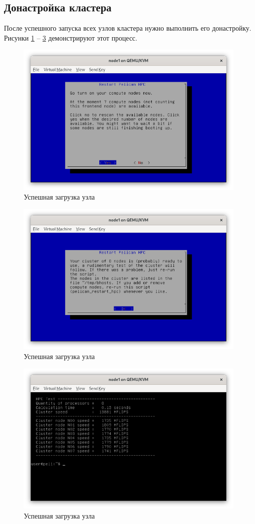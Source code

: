 \subsection{Донастройка кластера}

После успешного запуска всех узлов кластера нужно выполнить его донастройку. Рисунки \ref{postconf/01} -- \ref{postconf/03} демонстрируют этот процесс.

\begin{figure}[H]
	\centering
	\includegraphics[width=0.7\linewidth]{3-01}
	\caption{Успешная загрузка узла}
	\label{postconf/01}
\end{figure}

\begin{figure}[H]
	\centering
	\includegraphics[width=0.7\linewidth]{3-02}
	\caption{Успешная загрузка узла}
	\label{postconf/02}
\end{figure}

\begin{figure}[H]
	\centering
	\includegraphics[width=0.7\linewidth]{3-03}
	\caption{Успешная загрузка узла}
	\label{postconf/03}
\end{figure}

